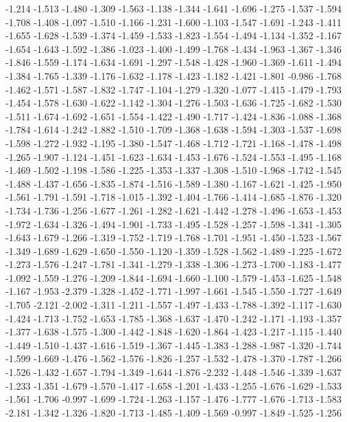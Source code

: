 \documentclass[9pt]{article}
\theoremstyle{plain}
\theoremstyle{definition}
\theoremstyle{remark}
\numberwithin{equation}{section}
\begin{document}
-1.214
-1.513
-1.480
-1.309
-1.563
-1.138
-1.344
-1.641
-1.696
-1.275
-1.537
-1.594
-1.708
-1.408
-1.097
-1.510
-1.166
-1.231
-1.600
-1.103
-1.547
-1.691
-1.243
-1.411
-1.655
-1.628
-1.539
-1.374
-1.459
-1.533
-1.823
-1.554
-1.494
-1.134
-1.352
-1.167
-1.654
-1.643
-1.592
-1.386
-1.023
-1.400
-1.499
-1.768
-1.434
-1.963
-1.367
-1.346
-1.846
-1.559
-1.174
-1.634
-1.691
-1.297
-1.548
-1.428
-1.960
-1.369
-1.611
-1.494
-1.384
-1.765
-1.339
-1.176
-1.632
-1.178
-1.423
-1.182
-1.421
-1.801
-0.986
-1.768
-1.462
-1.571
-1.587
-1.832
-1.747
-1.104
-1.279
-1.320
-1.077
-1.415
-1.479
-1.793
-1.454
-1.578
-1.630
-1.622
-1.142
-1.304
-1.276
-1.503
-1.636
-1.725
-1.682
-1.530
-1.511
-1.674
-1.692
-1.651
-1.554
-1.422
-1.490
-1.717
-1.424
-1.836
-1.088
-1.368
-1.784
-1.614
-1.242
-1.882
-1.510
-1.709
-1.368
-1.638
-1.594
-1.303
-1.537
-1.698
-1.598
-1.272
-1.932
-1.195
-1.380
-1.547
-1.468
-1.712
-1.721
-1.168
-1.478
-1.498
-1.265
-1.907
-1.124
-1.451
-1.623
-1.634
-1.453
-1.676
-1.524
-1.553
-1.495
-1.168
-1.469
-1.502
-1.198
-1.586
-1.225
-1.353
-1.337
-1.308
-1.510
-1.968
-1.742
-1.545
-1.488
-1.437
-1.656
-1.835
-1.874
-1.516
-1.589
-1.380
-1.167
-1.621
-1.425
-1.950
-1.561
-1.791
-1.591
-1.718
-1.015
-1.392
-1.404
-1.766
-1.414
-1.685
-1.876
-1.320
-1.734
-1.736
-1.256
-1.677
-1.261
-1.282
-1.621
-1.442
-1.278
-1.496
-1.653
-1.453
-1.972
-1.634
-1.326
-1.494
-1.901
-1.733
-1.495
-1.528
-1.257
-1.598
-1.341
-1.305
-1.643
-1.679
-1.266
-1.319
-1.752
-1.719
-1.768
-1.701
-1.951
-1.450
-1.523
-1.567
-1.349
-1.689
-1.629
-1.650
-1.550
-1.120
-1.359
-1.528
-1.562
-1.489
-1.225
-1.672
-1.273
-1.576
-1.247
-1.781
-1.341
-1.279
-1.338
-1.306
-1.273
-1.700
-1.183
-1.477
-1.092
-1.559
-1.276
-1.209
-1.844
-1.694
-1.660
-1.100
-1.579
-1.453
-1.625
-1.548
-1.167
-1.953
-2.379
-1.328
-1.452
-1.771
-1.997
-1.661
-1.545
-1.550
-1.727
-1.649
-1.705
-2.121
-2.002
-1.311
-1.211
-1.557
-1.497
-1.433
-1.788
-1.392
-1.117
-1.630
-1.424
-1.713
-1.752
-1.653
-1.785
-1.368
-1.637
-1.470
-1.242
-1.171
-1.193
-1.357
-1.377
-1.638
-1.575
-1.300
-1.442
-1.848
-1.620
-1.864
-1.423
-1.217
-1.115
-1.440
-1.449
-1.510
-1.437
-1.616
-1.519
-1.367
-1.445
-1.383
-1.288
-1.987
-1.320
-1.744
-1.599
-1.669
-1.476
-1.562
-1.576
-1.826
-1.257
-1.532
-1.478
-1.370
-1.787
-1.266
-1.526
-1.432
-1.657
-1.794
-1.349
-1.644
-1.876
-2.232
-1.448
-1.546
-1.339
-1.637
-1.233
-1.351
-1.679
-1.570
-1.417
-1.658
-1.201
-1.433
-1.255
-1.676
-1.629
-1.533
-1.561
-1.706
-0.997
-1.699
-1.724
-1.263
-1.157
-1.476
-1.777
-1.676
-1.713
-1.583
-2.181
-1.342
-1.326
-1.820
-1.713
-1.485
-1.409
-1.569
-0.997
-1.849
-1.525
-1.256
\end{document}
